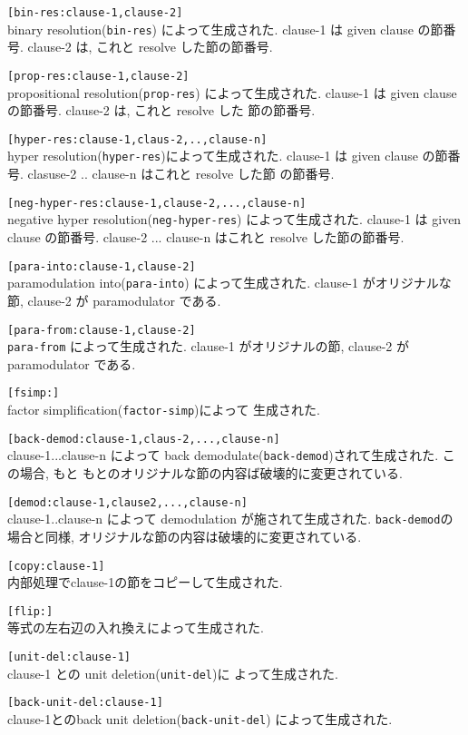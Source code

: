 \begin{description}
\item{}\texttt{[bin-res:clause-1,clause-2]}\\
  binary resolution(\texttt{bin-res}) によって生成された. clause-1 は
  given clause の節番号. clause-2 は, これと resolve した節の節番号.
\item{}\texttt{[prop-res:clause-1,clause-2]}\\
  propositional resolution(\texttt{prop-res}) によって生成された.
  clause-1 は given clause の節番号. clause-2 は, これと resolve した
  節の節番号. 
\item{}\texttt{[hyper-res:clause-1,claus-2,..,clause-n]}\\
  hyper resolution(\texttt{hyper-res})によって生成された. clause-1 は
  given clause の節番号. clasuse-2 .. clause-n はこれと resolve した節
  の節番号. 
\item{}\texttt{[neg-hyper-res:clause-1,clause-2,...,clause-n]}\\
  negative hyper resolution(\texttt{neg-hyper-res}) によって生成された.
  clause-1 は given clause の節番号. clause-2 ... clause-n はこれと
  resolve した節の節番号.
\item{}\texttt{[para-into:clause-1,clause-2]}\\
 paramodulation into(\texttt{para-into}) によって生成された.
  clause-1 がオリジナルな節, clause-2 が paramodulator である.
\item{}\texttt{[para-from:clause-1,clause-2]}\\
  \texttt{para-from} によって生成された.
  clause-1 がオリジナルの節, clause-2 が paramodulator である.
\item{}\texttt{[fsimp:]} \\
  factor simplification(\texttt{factor-simp})によって
  生成された.
\item{}\texttt{[back-demod:clause-1,claus-2,...,clause-n]}\\
  clause-1...clause-n によって
  back demodulate(\texttt{back-demod})されて生成された. この場合, もと
  もとのオリジナルな節の内容ば破壊的に変更されている.
\item{}\texttt{[demod:clause-1,clause2,...,clause-n]}\\
  clause-1..clause-n によって
  demodulation が施されて生成された. \texttt{back-demod}の場合と同様,
  オリジナルな節の内容は破壊的に変更されている.
\item{}\texttt{[copy:clause-1]} \\
  内部処理でclause-1の節をコピーして生成された.
\item{}\texttt{[flip:]} \\
  等式の左右辺の入れ換えによって生成された.
\item{}\texttt{[unit-del:clause-1]}\\
  clause-1 との unit deletion(\texttt{unit-del})に
  よって生成された.
\item{}\texttt{[back-unit-del:clause-1]}\\
  clause-1とのback unit deletion(\texttt{back-unit-del})
  によって生成された.
\end{description}

